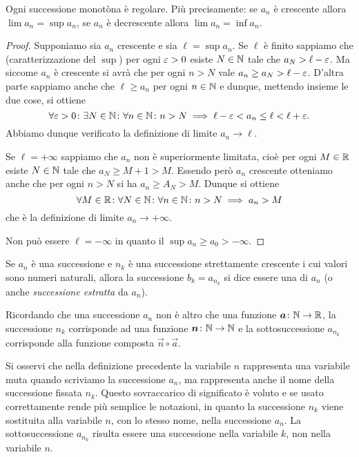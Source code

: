 \begin{theorem}
\mymark{***}
Ogni successione monotòna è regolare.
Più precisamente: se $a_n$ è crescente allora $\lim a_n = \sup a_n$,
se $a_n$ è decrescente allora $\lim a_n = \inf a_n$.
\end{theorem}
%
\begin{proof}
\mymark{***}
Supponiamo sia $a_n$ crescente e sia $\ell = \sup a_n$.
Se $\ell$ è finito sappiamo che (caratterizzazione del $\sup$)
per ogni $\varepsilon>0$ esiste $N\in \mathbb N$ tale che $a_N> \ell -\varepsilon$.
Ma siccome $a_n$ è crescente si avrà che per ogni $n>N$ vale
$a_n \ge a_N > \ell-\varepsilon$.
D'altra parte sappiamo anche che $\ell\ge a_n$ per ogni $n\in \mathbb N$
e dunque, mettendo insieme le due cose, si ottiene
\[
  \forall \varepsilon>0 \colon \exists N\in \mathbb N \colon \forall n\in \mathbb N\colon
   n>N \implies \ell-\varepsilon < a_n \le \ell < \ell + \varepsilon.
\]
Abbiamo dunque verificato la definizione di limite $a_n \to \ell$.

Se  $\ell=+\infty$ sappiamo che $a_n$ non è superiormente limitata, cioè per ogni $M\in \mathbb R$ esiste $N\in \mathbb N$ tale che $a_N \ge M+1 > M$.
Essendo però $a_n$ crescente otteniamo anche che per ogni $n>N$ si
 ha $a_n \ge A_N > M$. Dunque si ottiene
 \[
 \forall M\in \mathbb R\colon\forall N\in \mathbb N\colon \forall n \in \mathbb N\colon
  n>N \implies a_n > M
 \]
 che è la definizione di limite $a_n \to +\infty$.

Non può essere $\ell = -\infty$ in quanto il $\sup a_n \ge a_0 > -\infty$.
\end{proof}

\begin{definition}[sottosuccessione]
\mymark{*}
Se $a_n$ è una successione e $n_k$ è una successione strettamente crescente i cui valori sono numeri naturali, allora la successione
$b_k = a_{n_k}$ si dice essere una  di $a_n$
(o anche \emph{successione estratta} da $a_n$).
\end{definition}

Ricordando che una successione $a_n$ non è altro che una funzione
$\boldsymbol a\colon \mathbb N \to \mathbb R$, la successione $n_k$ corrisponde ad una funzione
$\boldsymbol n\colon \mathbb N \to \mathbb N$ e la sottosuccessione $a_{n_k}$ corrisponde alla
funzione composta $\vec n \circ \vec a$.

Si osservi che nella definizione precedente la variabile $n$ rappresenta
una variabile muta quando scriviamo la successione $a_n$, ma
rappresenta anche il nome della successione fissata $n_k$.
Questo sovraccarico
di significato è voluto e se usato correttamente rende più semplice
le notazioni, in quanto la successione $n_k$ viene sostituita alla
variabile $n$, con lo stesso nome, nella successione $a_n$.
La sottosuccessione $a_{n_k}$ risulta essere una successione nella variabile $k$, non nella variabile $n$.

